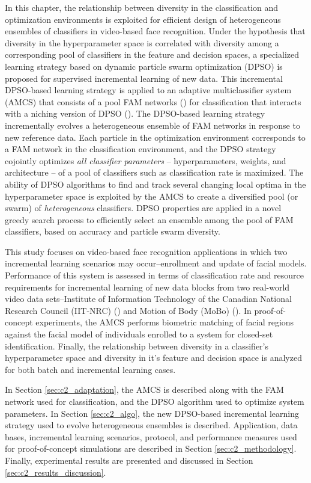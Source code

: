 In this chapter, the relationship between diversity in the classification and optimization environments is exploited for efficient design of heterogeneous ensembles of classifiers in video-based face recognition. 
Under the hypothesis that diversity in the hyperparameter space is correlated with diversity among a corresponding pool of classifiers in the feature and decision spaces, a specialized learning strategy based on dynamic particle swarm optimization (DPSO) is proposed for supervised incremental learning of new data.
This incremental DPSO-based learning strategy is applied to an adaptive multiclassifier system (AMCS) that consists of a pool FAM networks (\cite{carpenter92}) for classification that interacts with a niching version of DPSO (\cite{nickabadi08_2}).
The DPSO-based learning strategy incrementally evolves a heterogeneous ensemble of FAM networks in response to new reference data.
Each particle in the optimization environment corresponds to a FAM network in the classification environment, and the DPSO strategy cojointly optimizes \emph{all classifier parameters} -- hyperparameters, weights, and architecture -- of a pool of classifiers such as classification rate is maximized.
The ability of DPSO algorithms to find and track several changing local optima in the hyperparameter space is exploited by the AMCS to create a diversified pool (or swarm) of \emph{heterogeneous} classifiers.
DPSO properties are applied in a novel greedy search process to efficiently select an ensemble among the pool of FAM classifiers, based on accuracy and particle swarm diversity.

This study focuses on video-based face recognition applications in which two incremental learning scenarios may occur--enrollment and update of facial models.
Performance of this system is assessed in terms of classification rate and resource requirements for incremental learning of new data blocks from two real-world video data sets--Institute of Information Technology of the Canadian National Research Council (IIT-NRC) (\cite{gorodnichy05}) and Motion of Body (MoBo) (\cite{gross02}).
In proof-of-concept experiments, the AMCS performs biometric matching of facial regions against the facial model of individuals enrolled to a system for closed-set identification.
Finally, the relationship between diversity in a classifier's hyperparameter space and diversity in it's feature and decision space is analyzed for both batch and incremental learning cases.

In Section \ref{sec:c2_adaptation}, the AMCS is described along with the FAM network used for classification, and the DPSO algorithm used to optimize system parameters.
In Section \ref{sec:c2_algo}, the new DPSO-based incremental learning strategy used to evolve heterogeneous ensembles is described.
Application, data bases, incremental learning scenarios, protocol, and performance measures used for proof-of-concept simulations are described in Section \ref{sec:c2_methodology}.
Finally, experimental results are presented and discussed in Section \ref{sec:c2_results_discussion}.

